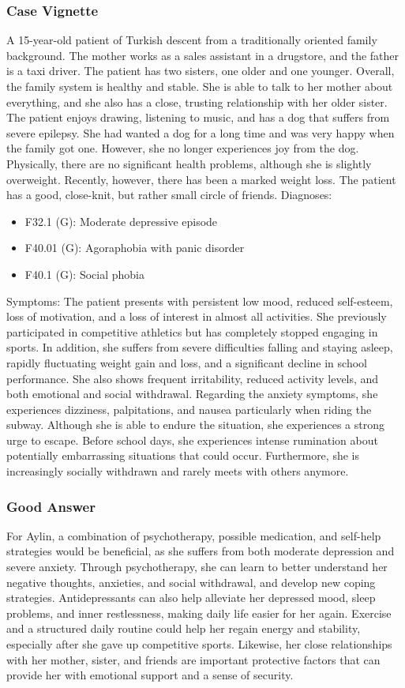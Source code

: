 \subsubsection{Case Vignette}
A 15-year-old patient of Turkish descent from a traditionally oriented family background.
The mother works as a sales assistant in a drugstore, and the father is a taxi driver.
The patient has two sisters, one older and one younger.
Overall, the family system is healthy and stable.
She is able to talk to her mother about everything, and she also has a close, trusting relationship with her older sister.
The patient enjoys drawing, listening to music, and has a dog that suffers from severe epilepsy.
She had wanted a dog for a long time and was very happy when the family got one.
However, she no longer experiences joy from the dog.
Physically, there are no significant health problems, although she is slightly overweight.
Recently, however, there has been a marked weight loss.
The patient has a good, close-knit, but rather small circle of friends.
Diagnoses:
\begin{itemize} 
\item F32.1 (G): Moderate depressive episode
\item F40.01 (G): Agoraphobia with panic disorder
\item F40.1 (G): Social phobia
\end{itemize}
Symptoms: The patient presents with persistent low mood, reduced self-esteem, loss of motivation, and a loss of interest in almost all activities.
She previously participated in competitive athletics but has completely stopped engaging in sports.
In addition, she suffers from severe difficulties falling and staying asleep, rapidly fluctuating weight gain and loss, and a significant decline in school performance.
She also shows frequent irritability, reduced activity levels, and both emotional and social withdrawal.
Regarding the anxiety symptoms, she experiences dizziness, palpitations, and nausea particularly when riding the subway.
Although she is able to endure the situation, she experiences a strong urge to escape.
Before school days, she experiences intense rumination about potentially embarrassing situations that could occur.
Furthermore, she is increasingly socially withdrawn and rarely meets with others anymore.
\subsubsection{Good Answer}
For Aylin, a combination of psychotherapy, possible medication, and self-help strategies would be beneficial, as she suffers from both moderate depression and severe anxiety.
Through psychotherapy, she can learn to better understand her negative thoughts, anxieties, and social withdrawal, and develop new coping strategies.
Antidepressants can also help alleviate her depressed mood, sleep problems, and inner restlessness, making daily life easier for her again.
Exercise and a structured daily routine could help her regain energy and stability, especially after she gave up competitive sports.
Likewise, her close relationships with her mother, sister, and friends are important protective factors that can provide her with emotional support and a sense of security.
